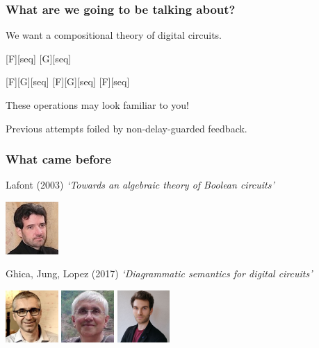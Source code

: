 \begin{frame}
    \frametitle{What are we going to be talking about?}

    \wait

    \centering
    \LARGE
    We want a \alert{compositional} theory of digital circuits.

    \vspace{0.5em}

    \wait
    [F][seq]
    [G][seq]

    \vspace{0.5em}

    \wait
    [F][G][seq]
    \wait
    \quad
    [F][G][seq]
    \wait
    \quad
    [F][seq]

    \wait
    \vspace{0.5em}

    \normalsize
    These operations may look familiar to you!

    \wait

    Previous attempts foiled by \alert{non-delay-guarded feedback}.

\end{frame}

\begin{frame}
    \frametitle{What came before}

    \wait
    \alert{Lafont (2003)}
    \emph{`Towards an algebraic theory of Boolean circuits'}

    \includegraphics[width=0.15\textwidth]{imgs/lafont}

    \vspace{0.5em}
    \wait

    \alert{Ghica, Jung, Lopez (2017)}
    \emph{`Diagrammatic semantics for digital circuits'}

    \includegraphics[width=0.15\textwidth]{imgs/ghica}
    \includegraphics[width=0.15\textwidth]{imgs/achim}
    \includegraphics[width=0.15\textwidth]{imgs/lopez}
\end{frame}

